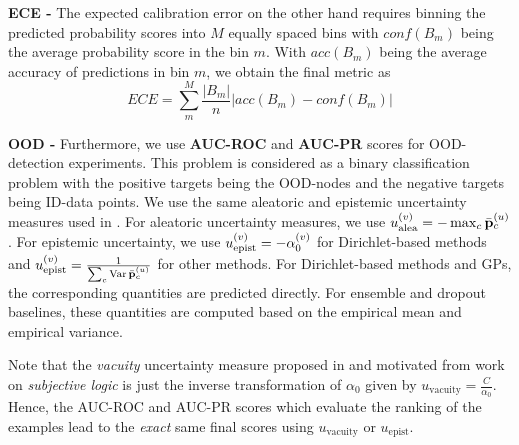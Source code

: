 \textbf{ECE -}  The expected calibration error on the other hand requires binning the predicted probability scores into $M$ equally spaced bins with $conf(B_m)$ being the average probability score in the bin $m$. With $acc(B_m)$ being the average accuracy of predictions in bin $m$, we obtain the final metric as 
\begin{equation}
    ECE = \sum_m^M \frac{|B_m|}{n} |acc(B_m) - conf(B_m)|
\end{equation}

\textbf{OOD -} Furthermore, we use \textbf{AUC-ROC} and \textbf{AUC-PR} scores for OOD-detection experiments. This problem is considered as a binary classification problem with the positive targets being the OOD-nodes and the negative targets being ID-data points. We use the same aleatoric and epistemic uncertainty measures used in \citep{charpentier2020}. For aleatoric uncertainty measures, we use $u_\text{alea}^{(v)} = - \max_c \bar{\mathbf{p}}_c^{(u)}$. For epistemic uncertainty, we use $u_\text{epist}^{(v)} = - \alpha_0^{(v)}$ for Dirichlet-based methods and $u_\text{epist}^{(v)} = \frac{1}{\sum_c \operatorname{Var} \bar{\mathbf{p}}_{c}^{(u)}}$ for other methods. For Dirichlet-based methods and GPs, the corresponding quantities are predicted directly. For ensemble and dropout baselines, these quantities are computed based on the empirical mean and empirical variance.

Note that the \emph{vacuity} uncertainty measure proposed in \citep{Zhao2020} and motivated from work on \emph{subjective logic} is just the inverse transformation of $\alpha_0$ given by $u_\text{vacuity} = \frac{C}{\alpha_0}$. Hence, the AUC-ROC and AUC-PR scores which evaluate the ranking of the examples lead to the \emph{exact} same final scores using $u_\text{vacuity}$ or $u_\text{epist}$.


